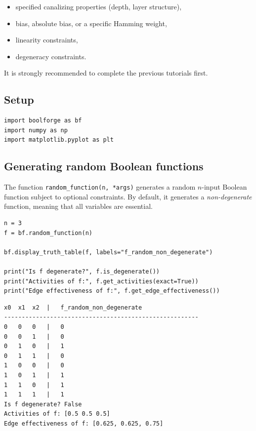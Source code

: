 \documentclass[
]{article}
\providecommand{\tightlist}{%
  \setlength{\itemsep}{0pt}\setlength{\parskip}{0pt}}
\begin{document}
\begin{itemize}
\tightlist
\item
  specified canalizing properties (depth, layer structure),
\item
  bias, absolute bias, or a specific Hamming weight,
\item
  linearity constraints,
\item
  degeneracy constraints.
\end{itemize}

It is strongly recommended to complete the previous tutorials first.

\subsection{Setup}\label{setup-3}

\begin{lstlisting}
import boolforge as bf
import numpy as np
import matplotlib.pyplot as plt
\end{lstlisting}

\subsection{Generating random Boolean
functions}\label{generating-random-boolean-functions}

The function \texttt{random\_function(n,\ *args)} generates a random
\(n\)-input Boolean function subject to optional constraints. By
default, it generates a \emph{non-degenerate} function, meaning that all
variables are essential.

\begin{lstlisting}
n = 3
f = bf.random_function(n)

bf.display_truth_table(f, labels="f_random_non_degenerate")

print("Is f degenerate?", f.is_degenerate())
print("Activities of f:", f.get_activities(exact=True))
print("Edge effectiveness of f:", f.get_edge_effectiveness())
\end{lstlisting}

\begin{lstlisting}
x0  x1  x2  |   f_random_non_degenerate
-------------------------------------------------------
0   0   0   |   0
0   0   1   |   0
0   1   0   |   1
0   1   1   |   0
1   0   0   |   0
1   0   1   |   1
1   1   0   |   1
1   1   1   |   1
Is f degenerate? False
Activities of f: [0.5 0.5 0.5]
Edge effectiveness of f: [0.625, 0.625, 0.75]
\end{lstlisting}
\end{document}
